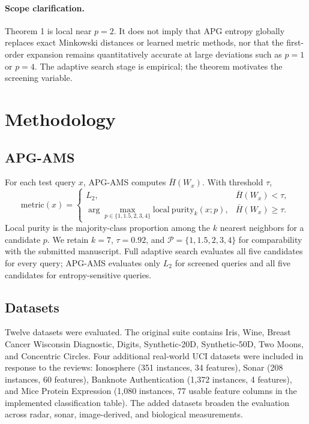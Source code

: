 \documentclass[11pt]{article}
\begin{document}
\paragraph{Scope clarification.}
Theorem 1 is local near $p=2$. It does not imply that APG entropy globally replaces exact Minkowski distances or learned metric methods, nor that the first-order expansion remains quantitatively accurate at large deviations such as $p=1$ or $p=4$. The adaptive search stage is empirical; the theorem motivates the screening variable.

\section{Methodology}
\subsection{APG-AMS}
For each test query $x$, APG-AMS computes $\bar H(W_x)$. With threshold $\tau$,
\begin{equation}
\mathrm{metric}(x)=
\begin{cases}
L_2, & \bar H(W_x)<\tau,\\
\arg\max_{p\in\{1,1.5,2,3,4\}}\mathrm{local\ purity}_k(x;p),
& \bar H(W_x)\ge\tau.
\end{cases}
\end{equation}
Local purity is the majority-class proportion among the $k$ nearest neighbors for a candidate $p$. We retain $k=7$, $\tau=0.92$, and $\mathcal P=\{1,1.5,2,3,4\}$ for comparability with the submitted manuscript. Full adaptive search evaluates all five candidates for every query; APG-AMS evaluates only $L_2$ for screened queries and all five candidates for entropy-sensitive queries.

\subsection{Datasets}
Twelve datasets were evaluated. The original suite contains Iris, Wine, Breast Cancer Wisconsin Diagnostic, Digits, Synthetic-20D, Synthetic-50D, Two Moons, and Concentric Circles. Four additional real-world UCI datasets were included in response to the reviews: Ionosphere (351 instances, 34 features), Sonar (208 instances, 60 features), Banknote Authentication (1,372 instances, 4 features), and Mice Protein Expression (1,080 instances, 77 usable feature columns in the implemented classification table). The added datasets broaden the evaluation across radar, sonar, image-derived, and biological measurements.
\end{document}
